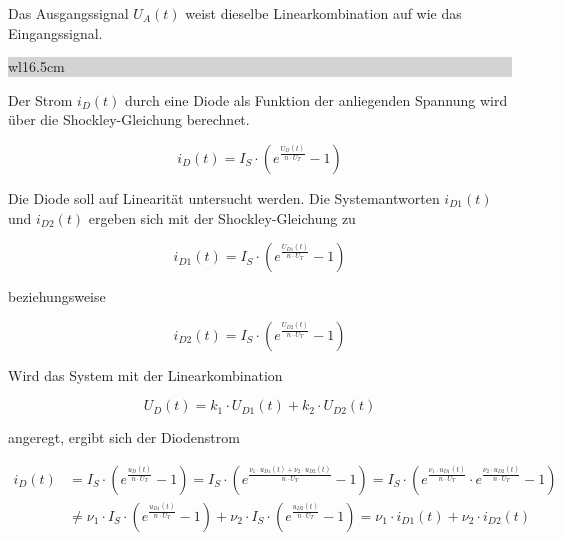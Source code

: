 \noindent Das Ausgangssignal $U_{A}(t)$ weist dieselbe Linearkombination auf wie das Eingangssignal.


\noindent
\colorbox{lightgray}{%
%
\renewcommand\arraystretch{0.6}%
\begin{tabular}{ wl{16.5cm} }
{\selectfont{Beispiel: Nichtlineares System}}
\end{tabular}%
}\bigskip

\noindent Der Strom $i_{D}(t)$  durch eine Diode als Funktion der anliegenden Spannung wird über die Shockley-Gleichung berechnet.

\begin{equation}\label{eq:threethirtythree}
i_{D}(t)=I_{S}\cdot (e^{\frac{U_{D}(t)}{n\cdot U_{T}}}-1)
\end{equation}

\noindent Die Diode soll auf Linearität untersucht werden. Die Systemantworten $i_{D1}(t)$  und $i_{D2}(t)$ ergeben sich mit der Shockley-Gleichung zu

\begin{equation}\label{eq:threethirtyfour}
i_{D1}(t)=I_{S}\cdot (e^{\frac{U_{D1}(t)}{n\cdot U_{T}}}-1)
\end{equation}

\noindent beziehungsweise

\begin{equation}\label{eq:threethirtyfive}
i_{D2}(t)=I_{S}\cdot (e^{\frac{U_{D2}(t)}{n\cdot U_{T}}}-1)
\end{equation}

\noindent Wird das System mit der Linearkombination

\begin{equation}\label{eq:threethirtysix}
U_{D}(t)=k_{1}\cdot U_{D1}(t) + k_{2}\cdot U_{D2}(t) 
\end{equation}

\noindent angeregt, ergibt sich der Diodenstrom

\begin{equation}\label{eq:threethirtyseven}
\begin{split}
i_{D}(t) & = I_{S} \cdot \left(e^{\frac{u_{D} \left(t\right)}{n\cdot U_{T} } } -1\right)=I_{S} \cdot \left(e^{\frac{\nu _{1} \cdot u_{D1} \left(t\right)+\nu _{2} \cdot u_{D2} \left(t\right)}{n\cdot U_{T} } } -1\right)=I_{S} \cdot \left(e^{\frac{\nu _{1} \cdot u_{D1} \left(t\right)}{n\cdot U_{T} } } \cdot e^{\frac{\nu _{2} \cdot u_{D2} \left(t\right)}{n\cdot U_{T} } } -1\right) \\ 
& \ne \nu _{1} \cdot I{}_{S} \cdot \left(e^{\frac{u_{D1} \left(t\right)}{n\cdot U_{T} } } -1\right)+\nu _{2} \cdot I{}_{S} \cdot \left(e^{\frac{u_{D2} \left(t\right)}{n\cdot U_{T} } } -1\right) = \nu _{1} \cdot i_{D1} \left(t\right)+\nu _{2} \cdot i_{D2} \left(t\right)
\end{split}
\end{equation}

